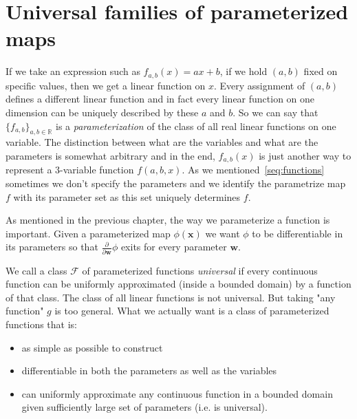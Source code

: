\documentclass[11pt, a4paper]{report}
\theoremstyle{plain}
\theoremstyle{definition}
\theoremstyle{remark}
\newcommand{\R}{\mathbb{R}}
\newcommand{\x}{\mathbf{x}}
\newcommand{\w}{\mathbf{w}}
\begin{document}
\section{Universal families of parameterized maps}
If we take an expression such as $f_{a,b}(x) = ax + b$, if we hold $(a,b)$ fixed
on specific values, then we get a linear function on $x$. Every assignment of
$(a,b)$ defines a different linear function and in fact every linear function on
one dimension can be uniquely described by these $a$ and $b$. So we can say that
$\{f_{a,b}\}_{a,b \in \R}$ is a \emph{parameterization} of the class of all real
linear functions on one variable. The distinction between what are the variables
and what are the parameters is somewhat arbitrary and in the end, $f_{a,b}(x)$
is just another way to represent a $3$-variable function $f(a,b,x)$. As we
mentioned~\ref{seq:functions} sometimes we don't specify the parameters and we
identify the parametrize map $f$ with its parameter set as this set uniquely
determines $f$. 

As mentioned in the previous chapter,
the way we parameterize a function is important. Given a parameterized
map $\phi (\x)$ we want $\phi$ to be differentiable in its parameters so that
$\frac{\partial}{\partial \w} \phi$ exits for every parameter $\w$. 



We call a class $\mathcal{F}$ of parameterized functions \emph{universal} if
every continuous function can be uniformly approximated (inside a bounded
domain) by a function of that class. The class of all linear functions is not
universal. But taking "any function" $g$ is too general. What we actually want
is a class of parameterized functions that is:
\begin{itemize}
\item{} as simple as possible to construct
\item{} differentiable in both the parameters as well as the variables
\item{} can uniformly approximate any continuous function in a bounded domain
given sufficiently large set of
parameters (i.e. is universal).
\end{itemize}
\end{document}
